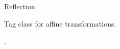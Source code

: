 \begin{ccRefClass}{Reflection}

\ccDefinition
Tag class for affine transformations.

\ccSeeAlso
{}, 
\end{ccRefClass}
